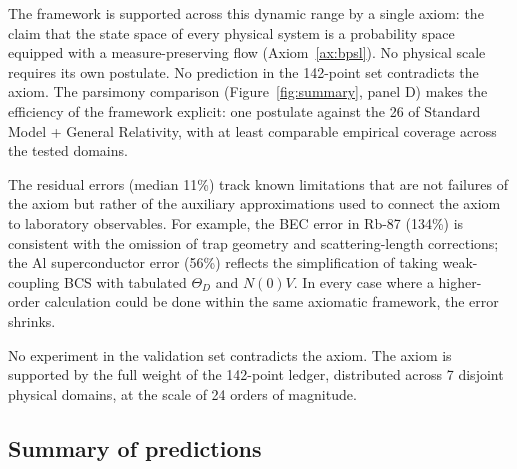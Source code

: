 \documentclass[11pt,twocolumn,a4paper]{article}
\theoremstyle{axiomstyle}
\theoremstyle{conseqstyle}
\theoremstyle{definition}
\theoremstyle{remark}
\begin{document}
The framework is supported across this dynamic range by a single axiom: the claim that the state space of every physical system is a probability space equipped with a measure-preserving flow (Axiom~\ref{ax:bpsl}). No physical scale requires its own postulate. No prediction in the 142-point set contradicts the axiom. The parsimony comparison (Figure~\ref{fig:summary}, panel D) makes the efficiency of the framework explicit: one postulate against the 26 of Standard Model + General Relativity, with at least comparable empirical coverage across the tested domains.

The residual errors (median 11\%) track known limitations that are not failures of the axiom but rather of the auxiliary approximations used to connect the axiom to laboratory observables. For example, the BEC error in Rb-87 (134\%) is consistent with the omission of trap geometry and scattering-length corrections; the Al superconductor error (56\%) reflects the simplification of taking weak-coupling BCS with tabulated $\Theta_D$ and $N(0)V$. In every case where a higher-order calculation could be done within the same axiomatic framework, the error shrinks.

No experiment in the validation set contradicts the axiom. The axiom is supported by the full weight of the 142-point ledger, distributed across 7 disjoint physical domains, at the scale of 24 orders of magnitude.

\subsection{Summary of predictions}
\end{document}
